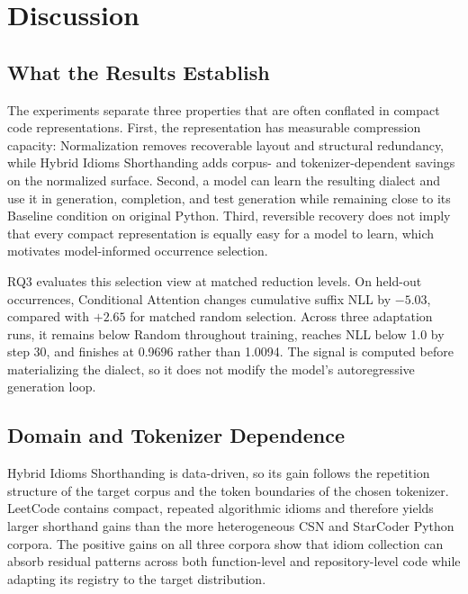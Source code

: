 \section{Discussion}

\subsection{What the Results Establish}

The experiments separate three properties that are often conflated in compact code representations. First, the representation has measurable compression capacity: Normalization removes recoverable layout and structural redundancy, while Hybrid Idioms Shorthanding adds corpus- and tokenizer-dependent savings on the normalized surface. Second, a model can learn the resulting dialect and use it in generation, completion, and test generation while remaining close to its Baseline condition on original Python. Third, reversible recovery does not imply that every compact representation is equally easy for a model to learn, which motivates model-informed occurrence selection.

RQ3 evaluates this selection view at matched reduction levels. On held-out occurrences, Conditional Attention changes cumulative suffix NLL by $-5.03$, compared with $+2.65$ for matched random selection. Across three adaptation runs, it remains below Random throughout training, reaches NLL below 1.0 by step 30, and finishes at 0.9696 rather than 1.0094. The signal is computed before materializing the dialect, so it does not modify the model's autoregressive generation loop.

\subsection{Domain and Tokenizer Dependence}

Hybrid Idioms Shorthanding is data-driven, so its gain follows the repetition structure of the target corpus and the token boundaries of the chosen tokenizer. LeetCode contains compact, repeated algorithmic idioms and therefore yields larger shorthand gains than the more heterogeneous CSN and StarCoder Python corpora. The positive gains on all three corpora show that idiom collection can absorb residual patterns across both function-level and repository-level code while adapting its registry to the target distribution.
